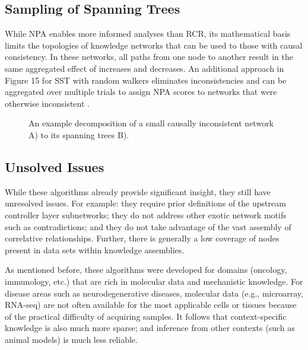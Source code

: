 \subsection{Sampling of Spanning Trees}

While \ac{NPA} enables more informed analyses than \ac{RCR}, its mathematical basis limits the topologies of knowledge networks that can be used to those with causal consistency. In these networks, all paths from one node to another result in the same aggregated effect of increases and decreases. An additional approach in Figure 15 for \ac{SST} with random walkers eliminates inconsistencies and can be aggregated over multiple trials to assign \ac{NPA} scores to networks that were otherwise inconsistent \cite{Vasilyev2014}. 

\begin{figure}
\captionsetup{format=plain}
\caption[Decomposition of Spanning Trees]{An example decomposition of a small causally inconsistent network A) to its spanning trees B)\cite{Vasilyev2014}.}
\label{Fig:sst_schematic}
\end{figure}

\subsection{Unsolved Issues}

While these algorithms already provide significant insight, they still have unresolved issues. For example: they require prior definitions of the upstream controller layer subnetworks; they do not address other exotic network motifs such as contradictions; and they do not take advantage of the vast assembly of correlative relationships. Further, there is generally a low coverage of nodes present in data sets within knowledge assemblies.

As mentioned before, these algorithms were developed for domains (oncology, immunology, etc.) that are rich in molecular data and mechanistic knowledge. For disease areas such as neurodegenerative diseases, molecular data (e.g., microarray, \ac{RNA}-seq) are not often available for the most applicable cells or tissues because of the practical difficulty of acquiring samples. It follows that context-specific knowledge is also much more sparse; and inference from other contexts (such as animal models) is much less reliable.

